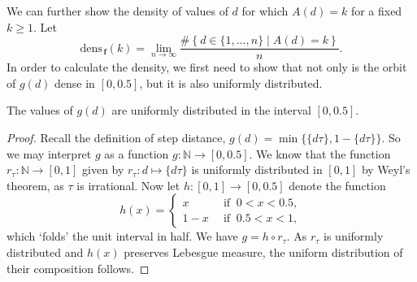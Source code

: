 \documentclass[10pt,a4paper,reqno]{amsart}
\newcommand{\N}{{\mathbb N}}
\newcommand{\bff}{{\mathbf f}}
\begin{document}
We can further show the density of values of $d$ for which $A(d)=k$ for a fixed $k\geq 1$.
Let
\[
\mathrm{dens}_{\,\bff}(k)=\lim_{n\to\infty}\frac{\#\left\{d\in\{1,\dots ,n\} \mid A(d)=k\right\}}{n}.
\]
In order to calculate the density, we first need to show that not only is the orbit of $g(d)$ dense in $[0,0.5]$, but it is also uniformly distributed.
\begin{prop}\label{LEM:gdisud}
The values of $g(d)$ are uniformly distributed in the interval $[0,0.5]$.
\end{prop}
\begin{proof}
Recall the definition of step distance, $g(d)=\min\{\{ d\tau\}, 1-\{ d\tau\}\}$. So we may interpret $g$ as a function $g \colon \N \to [0,0.5]$.
We know that the function $r_{\tau} \colon \N \to [0,1]$ given by $r_\tau \colon d \mapsto \{ d\tau\}$ is uniformly distributed in $[0,1]$ by Weyl's theorem, as $\tau$ is irrational. Now let $h\colon [0,1] \to [0,0.5]$ denote the function
\[h(x)=\begin{cases}
x\,&\text{ if }\:0<x<0.5,\\
1-x\,&\text{ if }\:0.5<x<1,
\end{cases}\]
which `folds' the unit interval in half. We have $g = h \circ r_\tau$. As $r_\tau$ is uniformly distributed and $h(x)$ preserves Lebesgue measure, the uniform distribution of their composition follows.

\end{proof}
\end{document}
